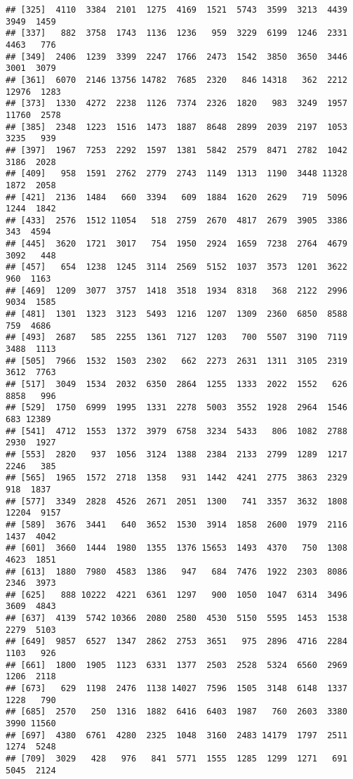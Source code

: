 \documentclass[
]{article}
\begin{document}
\begin{verbatim}
## [325]  4110  3384  2101  1275  4169  1521  5743  3599  3213  4439  3949  1459
## [337]   882  3758  1743  1136  1236   959  3229  6199  1246  2331  4463   776
## [349]  2406  1239  3399  2247  1766  2473  1542  3850  3650  3446  3001  3079
## [361]  6070  2146 13756 14782  7685  2320   846 14318   362  2212 12976  1283
## [373]  1330  4272  2238  1126  7374  2326  1820   983  3249  1957 11760  2578
## [385]  2348  1223  1516  1473  1887  8648  2899  2039  2197  1053  3235   939
## [397]  1967  7253  2292  1597  1381  5842  2579  8471  2782  1042  3186  2028
## [409]   958  1591  2762  2779  2743  1149  1313  1190  3448 11328  1872  2058
## [421]  2136  1484   660  3394   609  1884  1620  2629   719  5096  1244  1842
## [433]  2576  1512 11054   518  2759  2670  4817  2679  3905  3386   343  4594
## [445]  3620  1721  3017   754  1950  2924  1659  7238  2764  4679  3092   448
## [457]   654  1238  1245  3114  2569  5152  1037  3573  1201  3622   960  1163
## [469]  1209  3077  3757  1418  3518  1934  8318   368  2122  2996  9034  1585
## [481]  1301  1323  3123  5493  1216  1207  1309  2360  6850  8588   759  4686
## [493]  2687   585  2255  1361  7127  1203   700  5507  3190  7119  3488  1113
## [505]  7966  1532  1503  2302   662  2273  2631  1311  3105  2319  3612  7763
## [517]  3049  1534  2032  6350  2864  1255  1333  2022  1552   626  8858   996
## [529]  1750  6999  1995  1331  2278  5003  3552  1928  2964  1546   683 12389
## [541]  4712  1553  1372  3979  6758  3234  5433   806  1082  2788  2930  1927
## [553]  2820   937  1056  3124  1388  2384  2133  2799  1289  1217  2246   385
## [565]  1965  1572  2718  1358   931  1442  4241  2775  3863  2329   918  1837
## [577]  3349  2828  4526  2671  2051  1300   741  3357  3632  1808 12204  9157
## [589]  3676  3441   640  3652  1530  3914  1858  2600  1979  2116  1437  4042
## [601]  3660  1444  1980  1355  1376 15653  1493  4370   750  1308  4623  1851
## [613]  1880  7980  4583  1386   947   684  7476  1922  2303  8086  2346  3973
## [625]   888 10222  4221  6361  1297   900  1050  1047  6314  3496  3609  4843
## [637]  4139  5742 10366  2080  2580  4530  5150  5595  1453  1538  2279  5103
## [649]  9857  6527  1347  2862  2753  3651   975  2896  4716  2284  1103   926
## [661]  1800  1905  1123  6331  1377  2503  2528  5324  6560  2969  1206  2118
## [673]   629  1198  2476  1138 14027  7596  1505  3148  6148  1337  1228   790
## [685]  2570   250  1316  1882  6416  6403  1987   760  2603  3380  3990 11560
## [697]  4380  6761  4280  2325  1048  3160  2483 14179  1797  2511  1274  5248
## [709]  3029   428   976   841  5771  1555  1285  1299  1271   691  5045  2124

\end{verbatim}
\end{document}
